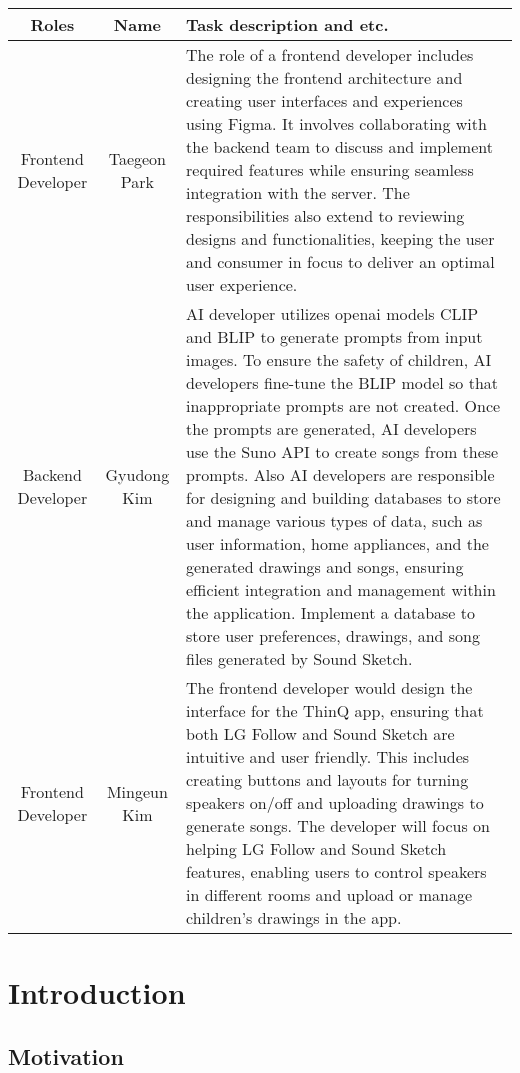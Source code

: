 \documentclass[conference]{IEEEtran}
\begin{document}
\begin{table}[h!]
\centering
\begin{tabular}{|c|c|p{3.5cm}|}
\hline
\textbf{Roles} & \textbf{Name} & \textbf{Task description and etc.} \\
\hline
Frontend Developer & Taegeon Park & The role of a frontend developer includes designing the frontend architecture and creating user interfaces and experiences using Figma. It involves collaborating with the backend team to discuss and implement required features while ensuring seamless integration with the server. The responsibilities also extend to reviewing designs and functionalities, keeping the user and consumer in focus to deliver an optimal user experience. \\
\hline
Backend Developer & Gyudong Kim & AI developer utilizes openai models CLIP and BLIP to generate prompts from input images. To ensure the safety of children, AI developers fine-tune the BLIP model so that inappropriate prompts are not created. Once the prompts are generated, AI developers use the Suno API to create songs from these prompts. Also AI developers are responsible for designing and building databases to store and manage various types of data, such as user information, home appliances, and the generated drawings and songs, ensuring efficient integration and management within the application. Implement a database to store user preferences, drawings, and song files generated by Sound Sketch. \\
\hline
Frontend Developer & Mingeun Kim & The frontend developer would design the interface for the ThinQ app, ensuring that both LG Follow and Sound Sketch are intuitive and user friendly. This includes creating buttons and layouts for turning speakers on/off and uploading drawings to generate songs. The developer will focus on helping LG Follow and Sound Sketch features, enabling users to control speakers in different rooms and upload or manage children's drawings in the app.  \\
\hline
\end{tabular}
\end{table}


\IEEEpeerreviewmaketitle

\section{Introduction}

\subsection{Motivation}
\end{document}
